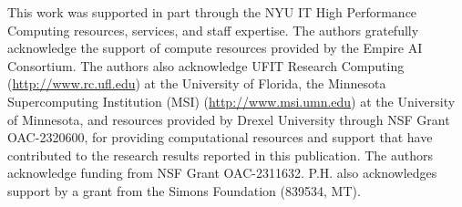 This work was supported in part through the NYU IT High Performance Computing resources, services, and staff expertise.
The authors gratefully acknowledge the support of compute resources provided by the Empire AI Consortium. 
The authors also acknowledge UFIT Research Computing (\url{http://www.rc.ufl.edu}) at the University of Florida, the Minnesota Supercomputing Institution (MSI) (\url{http://www.msi.umn.edu}) at the University of Minnesota, and resources provided by Drexel University through NSF Grant OAC-2320600, for providing computational resources and support that have contributed to the research results reported in this publication.
The authors acknowledge funding from NSF Grant OAC-2311632.
P.H. also acknowledges support by a grant from the Simons Foundation (839534, MT).


